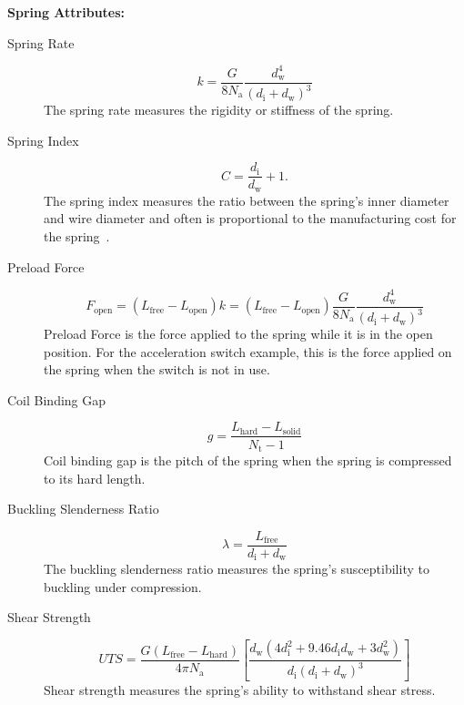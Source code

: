\documentclass[10pt]{article}
\begin{document}
		\noindent\textbf{Spring Attributes:}
			\begin{description}
				\item [Spring Rate] \begin{equation} k = \frac{G}{8N_{\text{a}}}\frac{d_{\text{w}}^{4}}{(d_{\text{i}} + d_{\text{w}})^{3}}\end{equation}
				The spring rate measures the rigidity or stiffness of the spring. 
			
			\item[Spring Index]\begin{equation}C = \frac{d_{\text{i}}}{d_{\text{w}}} + 1.\end{equation}
				The spring index measures the ratio between the spring's inner diameter and wire diameter and often is proportional to the manufacturing cost for the spring~\cite{SpringIndex}.
			
			\item[Preload Force]\begin{equation*} F_{\text{open}} = (L_{\text{free}}-L_{\text{open}})k = (L_{\text{free}}-L_{\text{open}})\frac{G}{8N_{\text{a}}}\frac{d_{\text{w}}^{4}}{(d_{\text{i}} + d_{\text{w}})^{3}} \end{equation*}
				Preload Force is the force applied to the spring while it is in the open position. For the acceleration switch example, this is the force applied on the spring when the switch is not in use.  
				
			\item[Coil Binding Gap]\begin{equation} g = \frac{L_{\text{hard}} - L_{\text{solid}}}{N_{\text{t}} - 1}\end{equation}		
				Coil binding gap is the pitch of the spring when the spring is compressed to its hard length. 
			 
			 \item[Buckling Slenderness Ratio]\begin{equation*} \lambda = \frac{L_{\text{free}}}{d_{\text{i}} + d_{\text{w}}} \end{equation*}
			 	The buckling slenderness ratio measures the spring's susceptibility to buckling under compression.
			 
			 \item[Shear Strength]\begin{equation} UTS = \frac{G(L_{\text{free}} - L_{\text{hard}})}{4 \pi N_{\text{a}}} \left[\frac{d_{\text{w}} (4d_{\text{i}}^{2} + 9.46d_{\text{i}} 
d_{\text{w}} + 3 d_{\text{w}}^{2})}{d_{\text{i}}(d_{\text{i}}+d_{\text{w}})^{3}}\right]\end{equation}
				Shear strength measures the spring's ability to withstand shear stress. 
			

\end{description}
\end{document}
